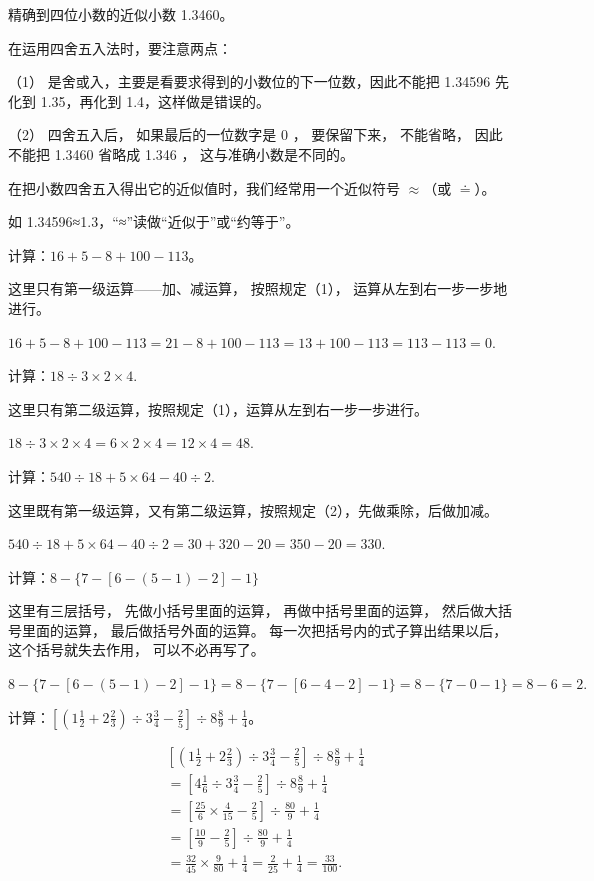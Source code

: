 精确到四位小数的近似小数 1.3460。

在运用四舍五入法时，要注意两点：

（1） 是舍或入，主要是看要求得到的小数位的下一位数，因此不能把 1.34596
先化到 1.35，再化到 1.4，这样做是错误的。

（2） 四舍五入后， 如果最后的一位数字是 0 ， 要保留下来， 不能省略，
因此不能把 1.3460 省略成 1.346 ， 这与准确小数是不同的。

在把小数四舍五入得出它的近似值时，我们经常用一个近似符号 \(\approx\)（或
\(\doteq\)）。

如 1.34596≈1.3，``≈''读做``近似于''或``约等于''。

 计算：\(16+5-8+100-113\)。

 这里只有第一级运算------加、减运算， 按照规定（1），
运算从左到右一步一步地进行。

\(16 + 5 - 8 + 100 - 113 = 21 - 8 + 100 - 113\)\(= 13 + 100 - 113 = 113 - 113 = 0.\)

 计算：\(18\div 3\times 2\times 4.\)

这里只有第二级运算，按照规定（1），运算从左到右一步一步进行。

\(18 \div 3 \times 2 \times 4 = 6 \times 2 \times 4 = 12 \times 4 = 48.\)

 计算：\(540 \div 18 + 5 \times 64 - 40 \div 2.\)

这里既有第一级运算，又有第二级运算，按照规定（2），先做乘除，后做加减。

\(540 \div 18 + 5 \times 64 - 40 \div 2 = 30 + 320 - 20 = 350 - 20 = 330.\)

 计算：\(8 - \{7 - [6 - (5 - 1) - 2] - 1\}\)

 这里有三层括号， 先做小括号里面的运算，
再做中括号里面的运算， 然后做大括号里面的运算， 最后做括号外面的运算。
每一次把括号内的式子算出结果以后， 这个括号就失去作用， 可以不必再写了。

\(8 - \{7 - [6 - (5 - 1) - 2] - 1\} = 8 - \{7 - [6 - 4 - 2] - 1\} = 8 - \{7 - 0 - 1\} = 8 - 6 = 2.\)

 计算：\(\left[\left(1\frac{1}{2} + 2\frac{2}{3}\right) \div 3\frac{3}{4} - \frac{2}{5}\right] \div 8\frac{8}{9} + \frac{1}{4}\)。

\[
\begin{aligned}
&\left[\left(1\frac{1}{2} + 2\frac{2}{3}\right) \div 3\frac{3}{4} - \frac{2}{5}\right] \div 8\frac{8}{9} + \frac{1}{4} \\
&= \left[ 4 \frac{1}{6} \div 3 \frac{3}{4} - \frac{2}{5} \right] \div 8 \frac{8}{9} + \frac{1}{4} \\
&= \left[ \frac{25}{6} \times \frac{4}{15} - \frac{2}{5} \right] \div \frac{80}{9} + \frac{1}{4} \\
&= \left[ \frac{10}{9} - \frac{2}{5} \right] \div \frac{80}{9} + \frac{1}{4} \\
&= \frac{32}{45} \times \frac{9}{80} + \frac{1}{4} = \frac{2}{25} + \frac{1}{4} = \frac{33}{100}.
\end{aligned}
\]

